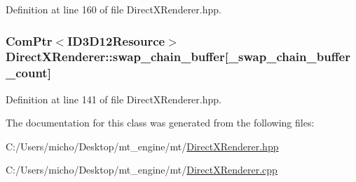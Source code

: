 Definition at line 160 of file Direct\+X\+Renderer.\+hpp.

\subsubsection[{\texorpdfstring{swap\+\_\+chain\+\_\+buffer}{swap_chain_buffer}}]{\setlength{\rightskip}{0pt plus 5cm}Com\+Ptr$<$I\+D3\+D12\+Resource$>$ Direct\+X\+Renderer\+::swap\+\_\+chain\+\_\+buffer\mbox{[}{\bf \+\_\+swap\+\_\+chain\+\_\+buffer\+\_\+count}\mbox{]}\hspace{0.3cm}{\ttfamily [protected]}}\hypertarget{class_direct_x_renderer_ad8a4b2130a07748ce0c503fe9c9c7d14_ad8a4b2130a07748ce0c503fe9c9c7d14}{}\label{class_direct_x_renderer_ad8a4b2130a07748ce0c503fe9c9c7d14_ad8a4b2130a07748ce0c503fe9c9c7d14}


Definition at line 141 of file Direct\+X\+Renderer.\+hpp.



The documentation for this class was generated from the following files\+:\begin{DoxyCompactItemize}
\item 
C\+:/\+Users/micho/\+Desktop/mt\+\_\+engine/mt/\hyperlink{_direct_x_renderer_8hpp}{Direct\+X\+Renderer.\+hpp}\item 
C\+:/\+Users/micho/\+Desktop/mt\+\_\+engine/mt/\hyperlink{_direct_x_renderer_8cpp}{Direct\+X\+Renderer.\+cpp}\end{DoxyCompactItemize}
